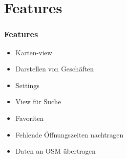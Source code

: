 \documentclass[hyperref]{beamer}
\begin{document}
\section{Features}

\begin{frame}
  \frametitle{Features}
  \begin{itemize}
  	\item Karten-view
    \item Darstellen von Geschäften
    \item Settings
    \item View für Suche
    \item Favoriten
    \item Fehlende Öffnungszeiten nachtragen
    \item Daten an OSM übertragen
  \end{itemize}
\end{frame}
\end{document}
